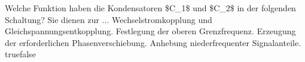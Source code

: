     {Welche Funktion haben die Kondensatoren \$C\_1\$ und \$C\_2\$ in der folgenden Schaltung? Sie dienen zur ...}
    {Wechselstromkopplung und Gleichspannungsentkopplung.}
    {Festlegung der oberen Grenzfrequenz.}
    {Erzeugung der erforderlichen Phasenverschiebung.}
    {Anhebung niederfrequenter Signalanteile.}
    {true}{false}